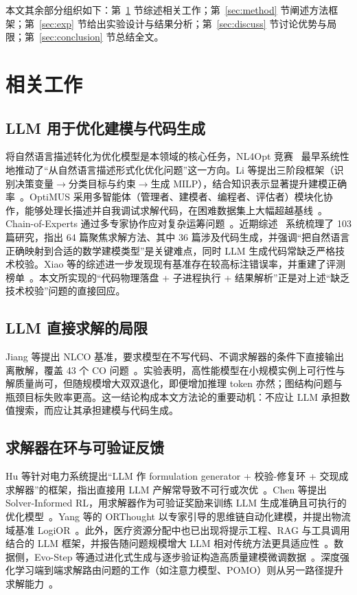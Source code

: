 \documentclass[11pt]{article}
\begin{document}
本文其余部分组织如下：第~\ref{sec:related} 节综述相关工作；第~\ref{sec:method} 节阐述方法框架；第~\ref{sec:exp} 节给出实验设计与结果分析；第~\ref{sec:discuss} 节讨论优势与局限；第~\ref{sec:conclusion} 节总结全文。

\section{相关工作}\label{sec:related}

\subsection{LLM 用于优化建模与代码生成}
将自然语言描述转化为优化模型是本领域的核心任务，NL4Opt 竞赛~\cite{ramamonjison2023nl4opt} 最早系统性地推动了“从自然语言描述形式化优化问题”这一方向。Li 等提出三阶段框架（识别决策变量$\rightarrow$分类目标与约束$\rightarrow$生成 MILP），结合知识表示显著提升建模正确率~\cite{li2023synthesizing}。OptiMUS 采用多智能体（管理者、建模者、编程者、评估者）模块化协作，能够处理长描述并自我调试求解代码，在困难数据集上大幅超越基线~\cite{ahmaditeshnizi2024optimus}。Chain-of-Experts 通过多专家协作应对复杂运筹问题~\cite{xiao2024chainofexperts}。近期综述~\cite{daros2026survey} 系统梳理了 103 篇研究，指出 64 篇聚焦求解方法、其中 36 篇涉及代码生成，并强调“把自然语言正确映射到合适的数学建模类型”是关键难点，同时 LLM 生成代码常缺乏严格技术校验。Xiao 等的综述进一步发现现有基准存在较高标注错误率，并重建了评测榜单~\cite{xiao2025survey}。本文所实现的“代码物理落盘 + 子进程执行 + 结果解析”正是对上述“缺乏技术校验”问题的直接回应。

\subsection{LLM 直接求解的局限}
Jiang 等提出 NLCO 基准，要求模型在不写代码、不调求解器的条件下直接输出离散解，覆盖 43 个 CO 问题~\cite{jiang2025nlco}。实验表明，高性能模型在小规模实例上可行性与解质量尚可，但随规模增大双双退化，即便增加推理 token 亦然；图结构问题与瓶颈目标失败率更高。这一结论构成本文方法论的重要动机：不应让 LLM 承担数值搜索，而应让其承担建模与代码生成。

\subsection{求解器在环与可验证反馈}
Hu 等针对电力系统提出“LLM 作 formulation generator + 校验-修复环 + 交现成求解器”的框架，指出直接用 LLM 产解常导致不可行或次优~\cite{hu2025power}。Chen 等提出 Solver-Informed RL，用求解器作为可验证奖励来训练 LLM 生成准确且可执行的优化模型~\cite{chen2025sirl}。Yang 等的 ORThought 以专家引导的思维链自动化建模，并提出物流域基准 LogiOR~\cite{yang2025orthought}。此外，医疗资源分配中也已出现将提示工程、RAG 与工具调用结合的 LLM 框架，并报告随问题规模增大 LLM 相对传统方法更具适应性~\cite{wan2025healthcare}。数据侧，Evo-Step 等通过进化式生成与逐步验证构造高质量建模微调数据~\cite{wu2025evostep}。深度强化学习端到端求解路由问题的工作（如注意力模型、POMO）则从另一路径提升求解能力~\cite{kool2019attention,kwon2020pomo}。
\end{document}
